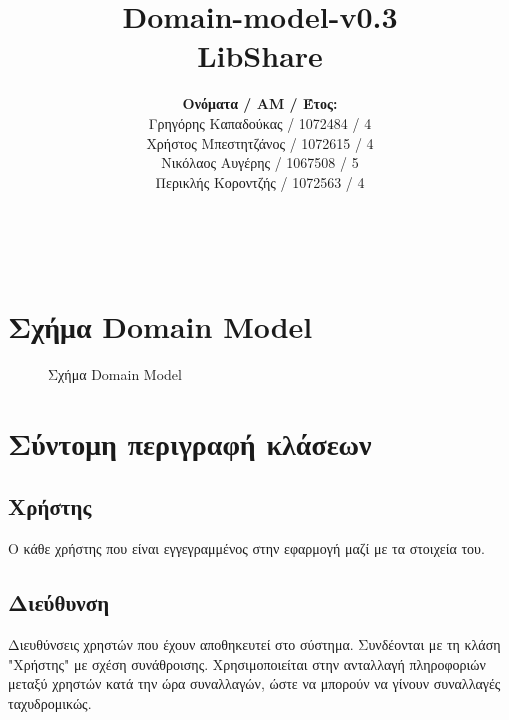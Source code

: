 \documentclass[12pt,a4paper]{article}
\title{Domain-model-v0.3 \\ LibShare}
\author{\textbf{Ονόματα / ΑΜ / Έτος:} \\ Γρηγόρης Καπαδούκας / 1072484 / 4\textdegree \\ Χρήστος Μπεστητζάνος / 1072615 / 4\textdegree \\ Νικόλαος Αυγέρης / 1067508 / 5\textdegree \\ Περικλής Κοροντζής / 1072563 / 4\textdegree}
\begin{document}
\makeatletter
\begin{center}
	\LARGE{\@title} \\
	\pagebreak
    \begin{LARGE}\@author\end{LARGE} 
    \pagebreak
\end{center}

\section{Σχήμα Domain Model}

\begin{figure}[H]
	\caption{Σχήμα Domain Model}
	\label{Σχήμα Domain Model}
\end{figure}

\section{Σύντομη περιγραφή κλάσεων}

\subsection{Χρήστης}
Ο κάθε χρήστης που είναι εγγεγραμμένος στην εφαρμογή μαζί με τα στοιχεία του. 

\subsection{Διεύθυνση}
Διευθύνσεις χρηστών που έχουν αποθηκευτεί στο σύστημα. Συνδέονται με τη κλάση "Χρήστης" με σχέση συνάθροισης. Χρησιμοποιείται στην ανταλλαγή πληροφοριών μεταξύ χρηστών κατά την ώρα συναλλαγών, ώστε να μπορούν να γίνουν συναλλαγές ταχυδρομικώς.
\end{document}

